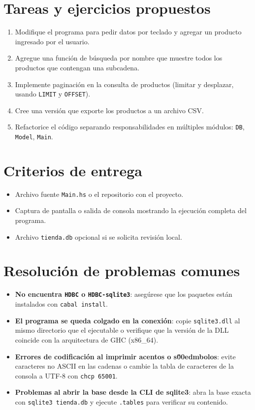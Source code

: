 \documentclass[12pt]{article}
\begin{document}
\section*{Tareas y ejercicios propuestos}
\begin{enumerate}
  \item Modifique el programa para pedir datos por teclado y agregar un producto ingresado por el usuario.
  \item Agregue una funci\'on de b\'usqueda por nombre que muestre todos los productos que contengan una subcadena.
  \item Implemente paginaci\'on en la consulta de productos (limitar y desplazar, usando \texttt{LIMIT} y \texttt{OFFSET}).
  \item Cree una versi\'on que exporte los productos a un archivo CSV.
  \item Refactorice el c\'odigo separando responsabilidades en m\'ultiples m\'odulos: \texttt{DB}, \texttt{Model}, \texttt{Main}.
\end{enumerate}

\section*{Criterios de entrega}
\begin{itemize}
  \item Archivo fuente \texttt{Main.hs} o el repositorio con el proyecto.
  \item Captura de pantalla o salida de consola mostrando la ejecuci\'on completa del programa.
  \item Archivo \texttt{tienda.db} opcional si se solicita revisi\'on local.
\end{itemize}

\section*{Resoluci\'on de problemas comunes}
\begin{itemize}
  \item \textbf{No encuentra \texttt{HDBC} o \texttt{HDBC-sqlite3}}: aseg\'urese que los paquetes est\'an instalados con \texttt{cabal install}.
  \item \textbf{El programa se queda colgado en la conexi\'on}: copie \texttt{sqlite3.dll} al mismo directorio que el ejecutable o verifique que la versi\'on de la DLL coincide con la arquitectura de GHC (x86\_64).
  \item \textbf{Errores de codificaci\'on al imprimir acentos o s\u00edmbolos}: evite caracteres no ASCII en las cadenas o cambie la tabla de caracteres de la consola a UTF-8 con \texttt{chcp 65001}.
  \item \textbf{Problemas al abrir la base desde la CLI de sqlite3}: abra la base exacta con \texttt{sqlite3 tienda.db} y ejecute \texttt{.tables} para verificar su contenido.
\end{itemize}
\end{document}
